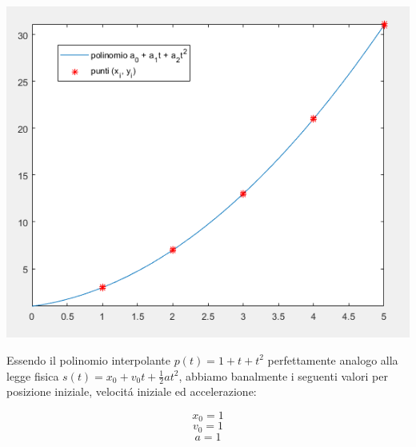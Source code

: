\begin{center}
	\includegraphics[scale=0.6]{cap4/4_10.png}
\end{center}


\vspace{0.2cm}
\noindent Essendo il polinomio interpolante \(p(t) = 1 + t + t^2\) perfettamente analogo alla legge fisica \(s(t) = x_0 + v_0t + \frac{1}{2}at^2\), abbiamo banalmente i seguenti valori per  posizione iniziale, velocit\'a iniziale ed accelerazione:

\[
  x_0 = 1
\]
\[
  v_0 = 1
\]
\[
  a = 1
\]

